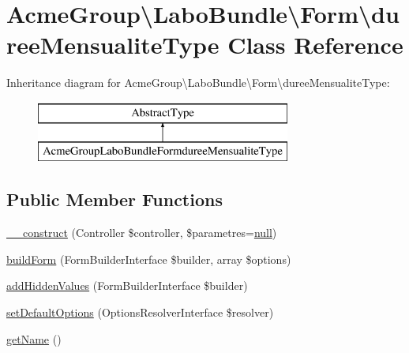 \hypertarget{class_acme_group_1_1_labo_bundle_1_1_form_1_1duree_mensualite_type}{\section{Acme\+Group\textbackslash{}Labo\+Bundle\textbackslash{}Form\textbackslash{}duree\+Mensualite\+Type Class Reference}
\label{class_acme_group_1_1_labo_bundle_1_1_form_1_1duree_mensualite_type}
}
Inheritance diagram for Acme\+Group\textbackslash{}Labo\+Bundle\textbackslash{}Form\textbackslash{}duree\+Mensualite\+Type\+:\begin{figure}[H]
\begin{center}
\leavevmode
\includegraphics[height=2.000000cm]{class_acme_group_1_1_labo_bundle_1_1_form_1_1duree_mensualite_type}
\end{center}
\end{figure}
\subsection*{Public Member Functions}
\begin{DoxyCompactItemize}
\item 
\hyperlink{class_acme_group_1_1_labo_bundle_1_1_form_1_1duree_mensualite_type_a5faefd3eb30ca827cdc3a84ce858476c}{\+\_\+\+\_\+construct} (Controller \$controller, \$parametres=\hyperlink{validate_8js_afb8e110345c45e74478894341ab6b28e}{null})
\item 
\hyperlink{class_acme_group_1_1_labo_bundle_1_1_form_1_1duree_mensualite_type_ab910eceb4e7f17c88c8fd8c11427053f}{build\+Form} (Form\+Builder\+Interface \$builder, array \$options)
\item 
\hyperlink{class_acme_group_1_1_labo_bundle_1_1_form_1_1duree_mensualite_type_a4ff0b52df373d0df47ac96d08953d2f9}{add\+Hidden\+Values} (Form\+Builder\+Interface \$builder)
\item 
\hyperlink{class_acme_group_1_1_labo_bundle_1_1_form_1_1duree_mensualite_type_aafad691811a5264d1f6cec29aeee77c4}{set\+Default\+Options} (Options\+Resolver\+Interface \$resolver)
\item 
\hyperlink{class_acme_group_1_1_labo_bundle_1_1_form_1_1duree_mensualite_type_a768f0d1ff3079e658a4c2d9a266ce600}{get\+Name} ()
\end{DoxyCompactItemize}


